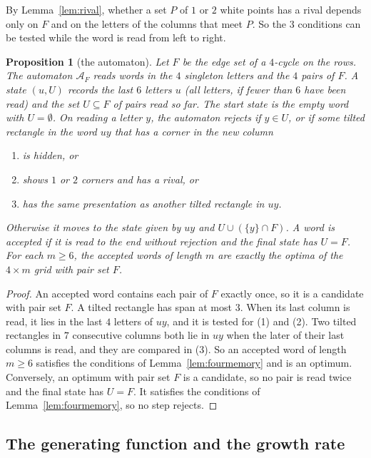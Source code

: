 \documentclass[12pt]{article}
\theoremstyle{plain}
\newtheorem{proposition}[theorem]{Proposition}
\theoremstyle{definition}
\theoremstyle{remark}
\begin{document}
By Lemma~\ref{lem:rival}, whether a set $P$ of $1$ or $2$ white points has a
rival depends only on $F$ and on the letters of the columns that meet $P$. So
the $3$ conditions can be tested while the word is read from left to right.

\begin{proposition}[the automaton]\label{prop:fourautomaton}
Let $F$ be the edge set of a $4$-cycle on the rows. The automaton $\mathcal A_F$
reads words in the $4$ singleton letters and the $4$ pairs of $F$. A state
$(u,U)$ records the last $6$ letters $u$ (all letters, if fewer than $6$ have
been read) and the set $U\subseteq F$ of pairs read so far. The start state is
the empty word with $U=\emptyset$. On reading a letter $y$, the automaton
rejects if $y\in U$, or if some tilted rectangle in the word $uy$ that has a
corner in the new column
\begin{enumerate}[(1)]
\item is hidden, or
\item shows $1$ or $2$ corners and has a rival, or
\item has the same presentation as another tilted rectangle in $uy$.
\end{enumerate}
Otherwise it moves to the state given by $uy$ and $U\cup(\{y\}\cap F)$. A word
is accepted if it is read to the end without rejection and the final state has
$U=F$. For each $m\ge6$, the accepted words of length $m$ are exactly the optima
of the $4\times m$ grid with pair set $F$.
\end{proposition}

\begin{proof}
An accepted word contains each pair of $F$ exactly once, so it is a candidate
with pair set $F$. A tilted rectangle has span at most $3$. When its last
column is read, it lies in the last $4$ letters of $uy$, and it is tested for
(1) and (2). Two tilted rectangles in $7$ consecutive columns both lie in $uy$
when the later of their last columns is read, and they are compared in (3). So
an accepted word of length $m\ge6$ satisfies the conditions of
Lemma~\ref{lem:fourmemory} and is an optimum. Conversely, an optimum with pair
set $F$ is a candidate, so no pair is read twice and the final state has $U=F$.
It satisfies the conditions of Lemma~\ref{lem:fourmemory}, so no step rejects.
\end{proof}

\subsection{The generating function and the growth rate}
\end{document}
